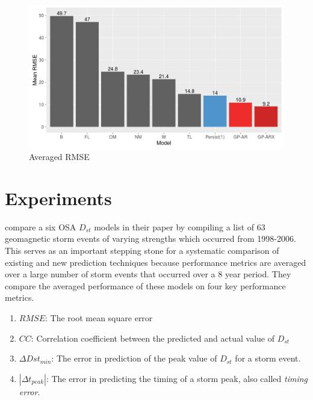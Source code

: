 \documentclass[referee,a4paper,12pt,traditabstract]{swsc}
\begin{document}
\begin{linenumbers}
\begin{figure}
   \centering
   \includegraphics[width=\textwidth]{Compare_RMSE.png}
      \caption{Averaged RMSE}
         \label{fig:rmse}
   \end{figure}

\section{Experiments} \label{sec:exp}

\citet{Ji2012} compare a six OSA $D_{st}$ models in their paper by compiling a list of 63 geomagnetic storm events of varying strengths which occurred from 1998-2006. This serves as an important stepping stone for a systematic comparison of existing and new prediction techniques because performance metrics are averaged over a large number of storm events that occurred over a 8 year period. They compare the averaged performance of these models on four key performance metrics.

\begin{enumerate}
    \item $RMSE$: The root mean square error
    \item $CC$: Correlation coefficient between the predicted and actual value of $D_{st}$
    \item $\Delta Dst_{min}$: The error in prediction of the peak value of $D_{st}$ for a storm event.
    \item $|\Delta t_{peak}|$: The error in predicting the timing of a storm peak, also called \emph{timing error}. 
\end{enumerate}



\end{linenumbers}
\end{document}
